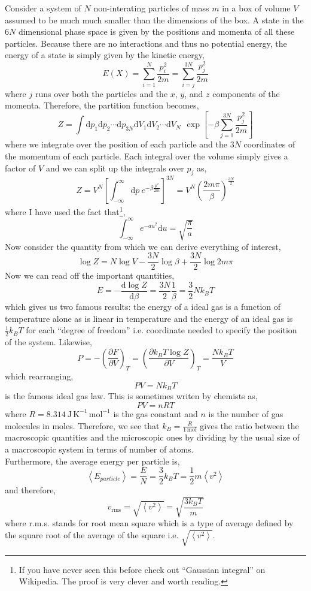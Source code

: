 \documentclass[11pt,a4paper]{article}
\renewcommand{\d}[1]{\mathrm{d}#1}
\newcommand{\deriv}[2]{\frac{\d{#1}}{\d{#2}}}
\newcommand{\cderiv}[3]{\left(\frac{\partial{#1}}{\partial{#2}}\right)_{#3}}
\theoremstyle{theorem}
\theoremstyle{definition}
\theoremstyle{definition}
\theoremstyle{remark}
\theoremstyle{definition}
\theoremstyle{remark}
\begin{document}
Consider a system of $N$ non-interating particles of mass $m$ in a box of volume $V$ assumed to be much much smaller than the dimensions of the box. A state in the $6N$ dimensional phase space is given by the positions and momenta of all these particles. Because there are no interactions and thus no potential energy, the energy of a state is simply given by the kinetic energy,
\[E(X) = \sum\limits_{i = 1}^N \frac{p_i^2}{2m} = \sum\limits_{i = j}^{3N} \frac{p_j^2}{2m}\]
 where $j$ runs over both the particles and the $x$, $y$, and $z$ components of the momenta.
Therefore, the partition function becomes,
\[ Z = \int \d{p_1} \d{p_2} \cdots \d{p_{3N}} \d{V_1} \d{V_2} \cdots \d{V_N} \: \: \exp{\left[- \beta \sum\limits_{j = 1}^{3N} \frac{p_j^2}{2m} \right]} \]
where we integrate over the position of each particle and the $3N$ coordinates of the momentum of each particle. Each integral over the volume simply gives a factor of $V$ and we can split up the integrals over $p_j$ as,
\[ Z = V^N \left[ \int_{-\infty}^{\infty} \d{p} \: e^{- \beta \frac{p^2}{2m}} \right]^{3N} = V^N  \left( \frac{2m\pi}{\beta} \right)^{\frac{3N}{2}} \]
where I have used the fact that\footnote{If you have never seen this before check out ``Gaussian integral'' on Wikipedia. The proof is very clever and worth reading.},
\[ \int_{-\infty}^{\infty} e^{-a u^2} \d{u} = \sqrt{\frac{\pi}{a}} \]
Now consider the quantity from which we can derive everything of interest,
\[ \log{Z} = N \log{V} - \frac{3 N}{2} \log{\beta} + \frac{3 N}{2} \log{2 m \pi} \]
Now we can read off the important quantities,
\[ E = - \deriv{\log{Z}}{\beta} = \frac{3 N}{2} \frac{1}{\beta} = \frac{3}{2} N k_B T\]
which gives us two famous results: the energy of a ideal gas is a function of temperature alone as is linear in temperature and the energy of an ideal gas is $\frac{1}{2} k_B T$ for each ``degree of freedom'' i.e. coordinate needed to specify the position of the system. Likewise,
\[ P = -\cderiv{F}{V}{T} = \cderiv{k_B T \log{Z}}{V}{T} = \frac{N k_B T}{V} \]
which rearranging,
\[ PV = N k_B T \]
is the famous ideal gas law. This is sometimes writen by chemists as,
\[ PV = n RT \]
where $R = 8.314 \: \mathrm{J} \, \mathrm{K}^{-1} \, \mathrm{mol}^{-1}$ is the gas constant and $n$ is the number of gas molecules in moles. Therefore, we see that $k_B = \frac{R}{1 \, \mathrm{mol}}$ gives the ratio between the macroscopic quantities and the microscopic ones by dividing by the usual size of a macroscopic system in terms of number of atoms. \bigskip\\
Furthermore, the average energy per particle is,
\[ \left<E_{particle} \right> = \frac{E}{N} = \frac{3}{2} k_B T = \frac{1}{2} m \left<v^2\right> \]
and therefore,
\[ v_{\mathrm{rms}} = \sqrt{\left< v^2 \right>} = \sqrt{\frac{3 k_B T}{m}} \]
where r.m.s. stands for root mean square which is a type of average defined by the square root of the average of the square i.e. $\sqrt{\left<v^2\right>}$. 
\end{document}
